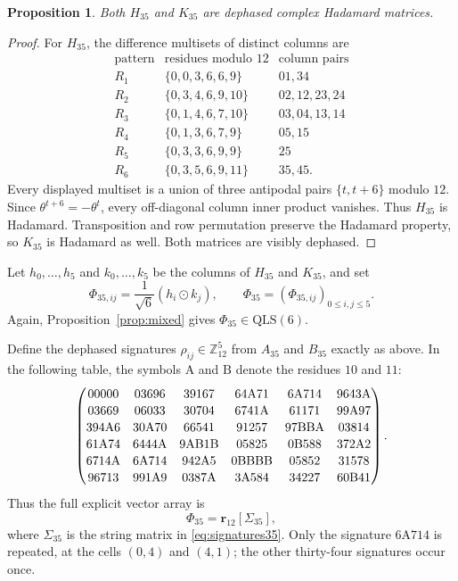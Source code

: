 \documentclass[11pt,a4paper]{article}
\newcommand{\Z}{\mathbb{Z}}
\newcommand{\QLS}{\mathrm{QLS}}
\newcommand{\od}{\mathbin{\odot}}
\newtheorem{proposition}{Proposition}
\begin{document}
\begin{proposition}\label{prop:H35K35had}
Both $H_{35}$ and $K_{35}$ are dephased complex Hadamard matrices.
\end{proposition}

\begin{proof}
For $H_{35}$, the difference multisets of distinct columns are
\[
\begin{array}{c|c|c}
\text{pattern}&\text{residues modulo }12&\text{column pairs}\\
\hline
R_1&\{0,0,3,6,6,9\}&01,34\\
R_2&\{0,3,4,6,9,10\}&02,12,23,24\\
R_3&\{0,1,4,6,7,10\}&03,04,13,14\\
R_4&\{0,1,3,6,7,9\}&05,15\\
R_5&\{0,3,3,6,9,9\}&25\\
R_6&\{0,3,5,6,9,11\}&35,45.
\end{array}
\]
Every displayed multiset is a union of three antipodal pairs
$\{t,t+6\}$ modulo $12$.  Since $\theta^{t+6}=-\theta^t$, every off-diagonal
column inner product vanishes.  Thus $H_{35}$ is Hadamard.  Transposition and
row permutation preserve the Hadamard property, so $K_{35}$ is Hadamard as
well.  Both matrices are visibly dephased.
\end{proof}

Let $h_0,\ldots,h_5$ and $k_0,\ldots,k_5$ be the columns of $H_{35}$ and
$K_{35}$, and set
\[
 \Phi_{35,ij}=\frac1{\sqrt6}(h_i\od k_j),
 \qquad
 \Phi_{35}=(\Phi_{35,ij})_{0\leq i,j\leq5}.
\]
Again, Proposition~\ref{prop:mixed} gives $\Phi_{35}\in\QLS(6)$.

Define the dephased signatures $\rho_{ij}\in\Z_{12}^5$ from $A_{35}$ and
$B_{35}$ exactly as above.  In the following table, the symbols
$\mathrm A$ and $\mathrm B$ denote the residues $10$ and $11$:
\begin{equation}\label{eq:signatures35}
\renewcommand{\arraystretch}{1.12}
 \begin{pmatrix}
 00000&03696&39167&64\mathrm A71&6\mathrm A714&9643\mathrm A\\
 03669&06033&30704&6741\mathrm A&61171&99\mathrm A97\\
 394\mathrm A6&30\mathrm A70&66541&91257&97\mathrm{BB}\mathrm A&03814\\
 61\mathrm A74&6444\mathrm A&9\mathrm{AB}1\mathrm B&05825&0\mathrm B588&372\mathrm A2\\
 6714\mathrm A&6\mathrm A714&942\mathrm A5&0\mathrm{BBBB}&05852&31578\\
 96713&991\mathrm A9&0387\mathrm A&3\mathrm A584&34227&60\mathrm B41
 \end{pmatrix}.
\end{equation}
Thus the full explicit vector array is
\begin{equation}\label{eq:explicit35}
 \Phi_{35}=\mathbf r_{12}\!\left[\Sigma_{35}\right],
\end{equation}
where $\Sigma_{35}$ is the string matrix in \eqref{eq:signatures35}.
Only the signature $6\mathrm A714$ is repeated, at the cells $(0,4)$ and
$(4,1)$; the other thirty-four signatures occur once.
\end{document}
